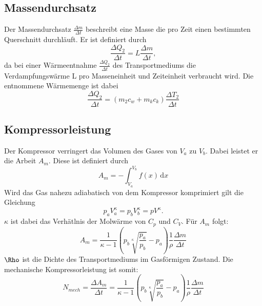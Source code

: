 \subsection{Massendurchsatz}
Der Massendurchsatz $\frac{\Delta m}{\Delta t}$ beschreibt eine Masse die pro Zeit einen bestimmten Querschnitt durchläuft.
Er ist definiert durch
\begin{equation}
  \frac{\Delta Q_2}{\Delta t} = L\frac{\Delta m}{\Delta t} ,
\end{equation}
da bei einer Wärmeentnahme $\frac{\Delta Q_2}{\Delta t}$ des Transportmediums die Verdampfungswärme L pro Masseneinheit und Zeiteinheit
verbraucht wird. Die entnommene Wärmemenge ist dabei
\begin{equation}
  \frac{\Delta Q_2}{\Delta t} = (m_2c_w + m_kc_k)\frac{\Delta T_2}{\Delta t}
\end{equation}
\subsection{Kompressorleistung}
Der Kompressor verringert das Volumen des Gases von $V_a$ zu $V_b$. Dabei leistet
er die Arbeit $A_m$. Diese ist definiert durch
\begin{equation}
  A_m = - \int_{V_a}^{V_b} f(x) \, \mathrm{d}x
\end{equation}
Wird das Gas nahezu adiabatisch von dem Kompressor komprimiert gilt die Gleichung
\begin{equation}
  p_a V_a^\kappa = p_b V_b^\kappa = pV^\kappa.
\end{equation}
$\kappa$ ist dabei das Verhätlnis der Molwärme von $C_p$ und $C_V$.
Für $A_m$ folgt:
\begin{equation}
  A_m = \frac{1}{\kappa -1}(p_b\sqrt[\kappa]{\frac{p_a}{p_b}}-p_a)\frac{1}{\rho}\frac{\Delta m}{\Delta t}
\end{equation}
$\Rho$ ist die Dichte des Transportmediums im Gasförmigen Zustand. Die mechanische Kompressorleistung
ist somit:
\begin{equation}
  N_{mech} = \frac{\Delta A_m}{\Delta t} = \frac{1}{\kappa -1} \left(p_b \sqrt[\kappa]{\frac{p_a}{p_b}}-p_a\right)\frac{1}{\rho}\frac{\Delta m}{\Delta t}
\end{equation}
\label{sec:Theorie}
